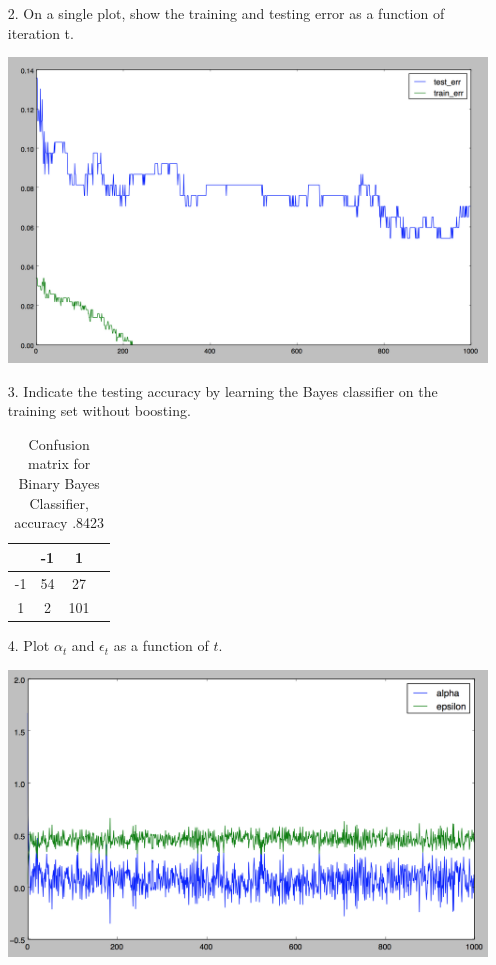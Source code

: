 \documentclass[11pt]{article}
\begin{document}
\begin{enumerate}
\item [2.] On a single plot, show the training and testing error as a function of iteration t.

\includegraphics[scale=.5]{images/p2testtrain.png}

\item[3.] Indicate the testing accuracy by learning the Bayes classifier on the training set without boosting.

\begin{table}[!th]
\centering
\begin{tabular}{|c|c|cl}
\hline
& -1 & 1 \\
\hline
-1 & 54 & 27 \\
1 & 2 & 101 \\
\hline
\end{tabular}
\caption{Confusion matrix for Binary Bayes Classifier, accuracy .8423}
\label{ex:table}
\end{table}


\item[4.] Plot $\alpha_t$ and $\epsilon_t$ as a function of $t$.

\includegraphics[scale=.5]{images/p2params.png}


\end{enumerate}
\end{document}
